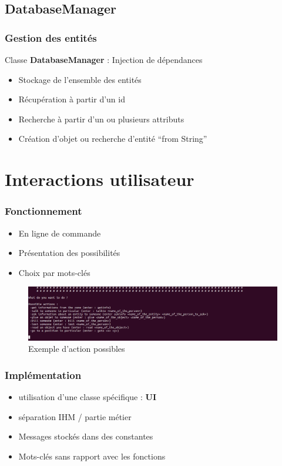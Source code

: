 \documentclass{beamer}
\begin{document}
\subsection{DatabaseManager}
\begin{frame}
  \frametitle{Gestion des entités}
  Classe \textbf{DatabaseManager} : Injection de dépendances
  \begin{itemize}
  \item Stockage de l'ensemble des entités
  \item Récupération à partir d'un id
  \item Recherche à partir d'un ou plusieurs attributs
  \item Création d'objet ou recherche d'entité ``from String''
  \end{itemize}
\end{frame}

\author{RIVOIRE Claire}
\section{Interactions utilisateur}
\begin{frame}
   \frametitle{Fonctionnement}
  \begin{itemize}
  \item En ligne de commande
  \item Présentation des possibilités
  \item Choix par mots-clés
  \end{itemize} 
\begin{figure}
    \begin{center}
      \includegraphics[scale=0.3]{./images/screenshootUI01.png}
      \caption{Exemple d'action possibles}
    \end{center}
  \end{figure}
\end{frame}

\begin{frame}
   \frametitle{Implémentation}
  \begin{itemize}
  \item utilisation d'une classe spécifique : \textbf{UI}
  \item séparation IHM / partie métier
  \item Messages stockés dans des constantes
  \item Mots-clés sans rapport avec les fonctions
  \end{itemize} 
\end{frame}
\end{document}
